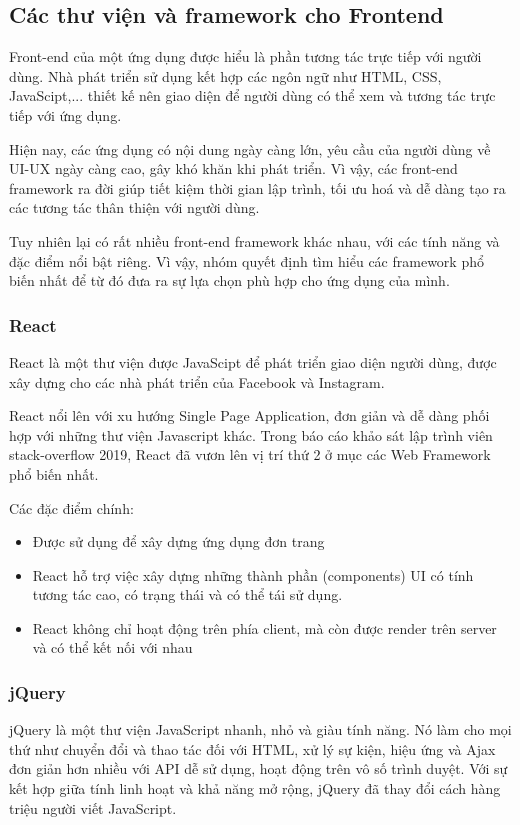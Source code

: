 \subsection{Các thư viện và framework cho Frontend}
Front-end của một ứng dụng được hiểu là phần tương tác trực tiếp với người dùng. Nhà phát triển sử dụng kết hợp các ngôn ngữ như HTML, CSS, JavaScipt,... thiết kế nên giao diện để người dùng có thể xem và tương tác trực tiếp với ứng dụng.

Hiện nay, các ứng dụng có nội dung ngày càng lớn, yêu cầu của người dùng về UI-UX ngày càng cao, gây khó khăn khi phát triển. Vì vậy, các front-end framework ra đời giúp tiết kiệm thời gian lập trình, tối ưu hoá và dễ dàng tạo ra các tương tác thân thiện với người dùng.

Tuy nhiên lại có rất nhiều front-end framework khác nhau, với các tính năng và đặc điểm nổi bật riêng. Vì vậy, nhóm quyết định tìm hiểu các framework phổ biến nhất để từ đó đưa ra sự lựa chọn phù hợp cho ứng dụng của mình.
\subsubsection{React}
React là một thư viện được JavaScipt để phát triển giao diện người dùng, được xây dựng cho các nhà phát triển của Facebook và Instagram.

React nổi lên với xu hướng Single Page Application, đơn giản và dễ dàng phối hợp với những thư viện Javascript khác. Trong báo cáo khảo sát lập trình viên stack-overflow 2019, React đã vươn lên vị trí thứ 2 ở mục các Web Framework phổ biến nhất.

Các đặc điểm chính:
\begin {itemize}
\item Được sử dụng để xây dựng ứng dụng đơn trang
\item React hỗ trợ việc xây dựng những thành phần (components) UI có tính tương tác cao, có trạng thái và có thể tái sử dụng.
\item React không chỉ hoạt động trên phía client, mà còn được render trên server và có thể kết nối với nhau
\end {itemize}

\subsubsection{jQuery}
jQuery là một thư viện JavaScript nhanh, nhỏ và giàu tính năng. Nó làm cho mọi thứ như chuyển đổi và thao tác đối với HTML, xử lý sự kiện, hiệu ứng và Ajax đơn giản hơn nhiều với API dễ sử dụng, hoạt động trên vô số trình duyệt. Với sự kết hợp giữa tính linh hoạt và khả năng mở rộng, jQuery đã thay đổi cách hàng triệu người viết JavaScript.\\

